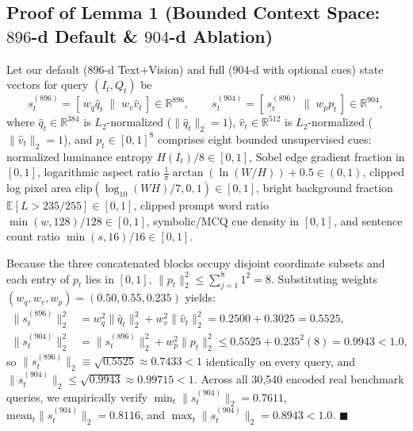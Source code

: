 \documentclass[10pt,twocolumn,letterpaper]{article}
\begin{document}
\subsection{Proof of Lemma 1 (Bounded Context Space: $896$-d Default \& $904$-d Ablation)}
Let our default ($896$-d Text+Vision) and full ($904$-d with optional cues) state vectors for query $(I_t, Q_t)$ be
\[
s_t^{(896)} = \left[\, w_q \hat{q}_t \;\|\; w_v \hat{v}_t \,\right] \in \mathbb{R}^{896}, \qquad
s_t^{(904)} = \left[\, s_t^{(896)} \;\|\; w_p p_t \,\right] \in \mathbb{R}^{904},
\]
where $\hat{q}_t \in \mathbb{R}^{384}$ is $L_2$-normalized ($\|\hat{q}_t\|_2 = 1$), $\hat{v}_t \in \mathbb{R}^{512}$ is $L_2$-normalized ($\|\hat{v}_t\|_2 = 1$), and $p_t \in [0, 1]^8$ comprises eight bounded unsupervised cues: normalized luminance entropy $H(I_t)/8 \in [0,1]$, Sobel edge gradient fraction in $[0,1]$, logarithmic aspect ratio $\frac{1}{\pi}\arctan(\ln(W/H))+0.5 \in (0,1)$, clipped log pixel area $\text{clip}(\log_{10}(WH)/7,0,1) \in [0,1]$, bright background fraction $\mathbb{E}[L > 235/255] \in [0,1]$, clipped prompt word ratio $\min(w,128)/128 \in [0,1]$, symbolic/MCQ cue density in $[0,1]$, and sentence count ratio $\min(s,16)/16 \in [0,1]$.

Because the three concatenated blocks occupy disjoint coordinate subsets and each entry of $p_t$ lies in $[0,1]$, $\|p_t\|_2^2 \le \sum_{j=1}^{8} 1^2 = 8$. Substituting weights $(w_q, w_v, w_p) = (0.50, 0.55, 0.235)$ yields:
\begin{align}
\|s_t^{(896)}\|_2^2 &= w_q^2 \|\hat{q}_t\|_2^2 + w_v^2 \|\hat{v}_t\|_2^2 = 0.2500 + 0.3025 = 0.5525, \\
\|s_t^{(904)}\|_2^2 &= \|s_t^{(896)}\|_2^2 + w_p^2 \|p_t\|_2^2 \le 0.5525 + 0.235^2(8) = 0.9943 < 1.0,
\end{align}
so $\|s_t^{(896)}\|_2 \equiv \sqrt{0.5525} \approx 0.7433 < 1$ identically on every query, and $\|s_t^{(904)}\|_2 \le \sqrt{0.9943} \approx 0.99715 < 1$. Across all 30,540 encoded real benchmark queries, we empirically verify $\min_t \|s_t^{(904)}\|_2 = 0.7611$, $\text{mean}_t \|s_t^{(904)}\|_2 = 0.8116$, and $\max_t \|s_t^{(904)}\|_2 = 0.8943 < 1.0$. \hfill $\blacksquare$
\end{document}
